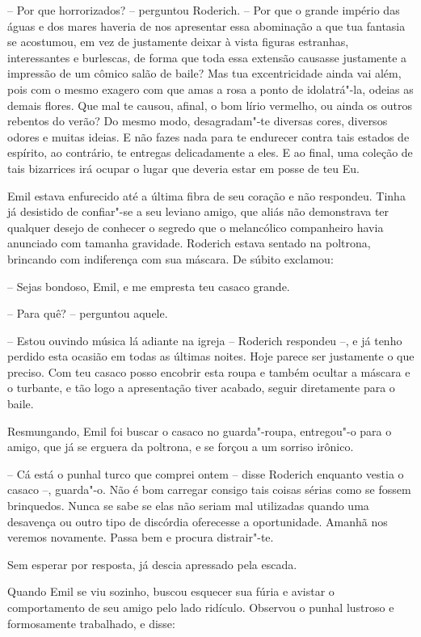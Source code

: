 -- Por que horrorizados? -- perguntou Roderich. -- Por que o grande
império das águas e dos mares haveria de nos apresentar essa abominação
a que tua fantasia se acostumou, em vez de justamente deixar à vista
figuras estranhas, interessantes e burlescas, de forma que toda essa
extensão causasse justamente a impressão de um cômico salão de baile?
Mas tua excentricidade ainda vai além, pois com o mesmo exagero com que
amas a rosa a ponto de idolatrá"-la, odeias as demais flores. Que mal te
causou, afinal, o bom lírio vermelho, ou ainda os outros rebentos do
verão? Do mesmo modo, desagradam"-te diversas cores, diversos odores e
muitas ideias. E não fazes nada para te endurecer contra tais estados
de espírito, ao contrário, te entregas delicadamente a eles. E ao
final, uma coleção de tais bizarrices irá ocupar o lugar que deveria
estar em posse de teu Eu.

Emil estava enfurecido até a última fibra de seu coração e não
respondeu. Tinha já desistido de confiar"-se a seu leviano amigo, que
aliás não demonstrava ter qualquer desejo de conhecer o segredo que o
melancólico companheiro havia anunciado com tamanha gravidade. Roderich
estava sentado na poltrona, brincando com indiferença com sua máscara.
De súbito exclamou:

-- Sejas bondoso, Emil, e me empresta teu casaco grande.

-- Para quê? -- perguntou aquele.

-- Estou ouvindo música lá adiante na igreja -- Roderich respondeu --, e
já tenho perdido esta ocasião em todas as últimas noites. Hoje parece
ser justamente o que preciso. Com teu casaco posso encobrir esta roupa
e também ocultar a máscara e o turbante, e tão logo a apresentação
tiver acabado, seguir diretamente para o baile.

Resmungando, Emil foi buscar o casaco no guarda"-roupa, entregou"-o para o
amigo, que já se erguera da poltrona, e se forçou a um sorriso irônico.

-- Cá está o punhal turco que comprei ontem -- disse Roderich
enquanto vestia o casaco --, guarda"-o. Não é bom carregar consigo tais
coisas sérias como se fossem brinquedos. Nunca se sabe se elas não
seriam mal utilizadas quando uma desavença ou outro tipo de discórdia
oferecesse a oportunidade. Amanhã nos veremos novamente. Passa bem e
procura distrair"-te.

Sem esperar por resposta, já descia apressado pela escada.

Quando Emil se viu sozinho, buscou esquecer sua fúria e avistar o
comportamento de seu amigo pelo lado ridículo. Observou o punhal
lustroso e formosamente trabalhado, e disse:

